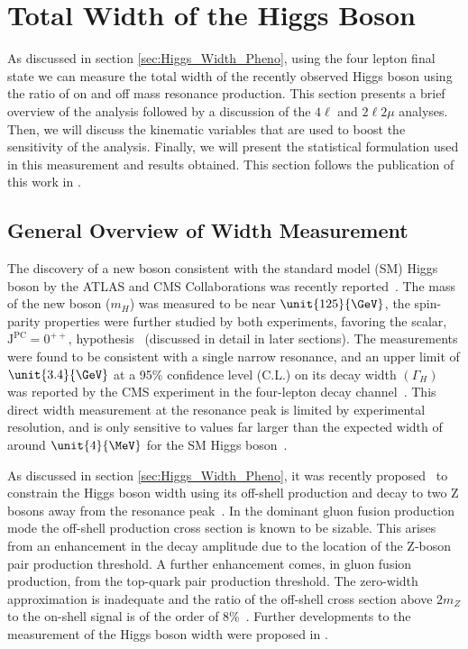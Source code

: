 \chapter{Total Width of the Higgs Boson}
\label{sec:Width_Experiment}

As discussed in section \ref{sec:Higgs_Width_Pheno}, using the four lepton final state we can measure the total width of the recently observed Higgs boson using the ratio of on and off mass resonance production. This section presents a brief overview of the analysis followed by a discussion of the $4\ell$ and $2\ell2\mu$ analyses. Then, we will discuss the kinematic variables that are used to boost the sensitivity of the analysis. Finally, we will present the statistical formulation used in this measurement and results obtained. This section follows the publication of this work in \cite{Khachatryan:2014iha}.

\section{General Overview of Width Measurement}
\label{sec:General_H_ZZ_Width}

The discovery of a new boson consistent with the standard model (SM) Higgs boson by the ATLAS and CMS Collaborations was recently reported~\cite{Aad:2012tfa, Chatrchyan:2012ufa, Chatrchyan:2013lba}. The mass of the new boson ($m_{H}$) was measured to be near $\unit{125}{\GeV}$, the spin-parity properties were further studied by both experiments, favoring the scalar, $\mathrm{J}^{\mathrm{PC}} = 0^{++}$, hypothesis~\cite{Chatrchyan:2012jja,Aad:2013wqa,Aad:2013xqa,Chatrchyan:2013mxa} (discussed in detail in later sections). The measurements were found to be consistent with a single narrow resonance, and an upper limit of $\unit{3.4}{\GeV}$ at a 95\% confidence level (C.L.) on its decay width $\left(\Gamma_{H}\right)$ was reported by the CMS experiment in the four-lepton decay channel~\cite{Chatrchyan:2013mxa}. This direct width measurement at the resonance peak is limited by experimental resolution, and is only sensitive to values far larger than the expected width of around $\unit{4}{\MeV}$ for the SM Higgs boson~\cite{Dittmaier:2011ti,Heinemeyer:2013tqa}.

As discussed in section \ref{sec:Higgs_Width_Pheno}, it was recently proposed~\cite{Caola:2013yja} to constrain the Higgs boson width using its
off-shell production and decay to two Z bosons away from the resonance peak~\cite{Kauer:2012hd}.
In the dominant gluon fusion production mode the off-shell production cross section is known to be
sizable. This arises from an enhancement in the decay amplitude due to the location of the Z-boson pair production
threshold. A further enhancement comes, in gluon fusion production, from the top-quark
pair production threshold. The zero-width approximation is inadequate and the ratio of the off-shell
cross section above $2m_{Z}$ to the on-shell signal is of the order of 8\%~\cite{Kauer:2012hd,Kauer:2013cga}.
Further developments to the measurement of the Higgs boson width were proposed in \cite{Campbell:2013una,Passarino:2013bha}.

